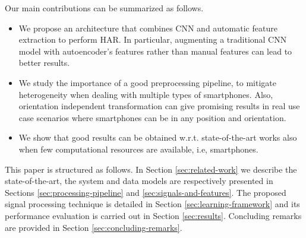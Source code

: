 Our main contributions can be summarized as follows.

\begin{itemize}
  \item We propose an architecture that combines CNN and automatic
    feature extraction to perform HAR. In particular, augmenting a
    traditional CNN model with autoencoder's features rather than
    manual features can lead to better results.
  \item We study the importance of a good preprocessing pipeline, to
    mitigate heterogeneity when dealing with multiple types of
    smartphones. Also, orientation independent transformation can give
    promising results in real use case scenarios where smartphones can
    be in any position and orientation.
  \item We show that good results can be obtained
    w.r.t. state-of-the-art works also when few computational
    resources are available, i.e, smartphones.
\end{itemize}

This paper is structured as follows. In Section \ref{sec:related-work}
we describe the state-of-the-art, the system and data models are
respectively presented in Sections \ref{sec:processing-pipeline} and
\ref{sec:signals-and-features}. The proposed signal processing
technique is detailed in Section \ref{sec:learning-framework} and its
performance evaluation is carried out in Section
\ref{sec:results}. Concluding remarks are provided in Section
\ref{sec:concluding-remarks}.

